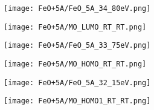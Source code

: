         \begin{figure}
            \centering
            \begin{subfigure}[t]{0.48\textwidth}
                \centering
                \texttt{[image: FeO+5A/FeO\_5A\_34\_80eV.png]}
                \label{fig:MOT_FeO+5A_exp_1}
            \end{subfigure}
            \begin{subfigure}[t]{0.48\textwidth}
                \centering
                \texttt{[image: FeO+5A/MO\_LUMO\_RT\_RT.png]}
                \label{fig:MOT_FeO+5A_theo_1}
            \end{subfigure}
            \centering
            \begin{subfigure}[t]{0.48\textwidth}
                \centering
                \texttt{[image: FeO+5A/FeO\_5A\_33\_75eV.png]}
                \label{fig:MOT_FeO+5A_exp_2}
            \end{subfigure}
            \begin{subfigure}[t]{0.48\textwidth}
                \centering
                \texttt{[image: FeO+5A/MO\_HOMO\_RT\_RT.png]}
                \label{fig:MOT_FeO+5A_theo_2}
            \end{subfigure}
            \centering
            \begin{subfigure}[t]{0.48\textwidth}
                \centering
                \texttt{[image: FeO+5A/FeO\_5A\_32\_15eV.png]}
                \label{fig:MOT_FeO+5A_exp_3}
            \end{subfigure}
            \begin{subfigure}[t]{0.48\textwidth}
                \centering
                \texttt{[image: FeO+5A/MO\_HOMO1\_RT\_RT.png]}

\end{subfigure}
\end{figure}
